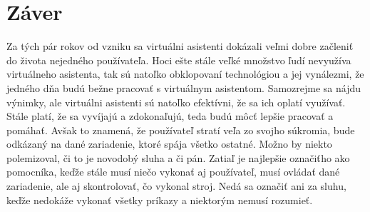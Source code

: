 \documentclass[10pt,twoside,slovak,coursepaper]{article}
\begin{document}
\section{Záver}
Za tých pár rokov od vzniku sa virtuálni asistenti dokázali veľmi dobre začleniť do života nejedného používateľa. Hoci ešte stále veľké množstvo ľudí  nevyužíva virtuálneho asistenta, tak sú natoľko obklopovaní technológiou a jej vynálezmi, že jedného dňa budú bežne pracovať s virtuálnym asistentom. Samozrejme sa nájdu výnimky, ale virtuálni asistenti sú natoľko efektívni, že sa ich oplatí využívať. Stále platí, že sa vyvíjajú a zdokonaľujú, teda budú môcť lepšie pracovať a pomáhať. Avšak to znamená, že používateľ stratí veľa zo svojho súkromia, bude odkázaný na dané zariadenie, ktoré spája všetko ostatné. Možno by niekto polemizoval, či to je novodobý sluha a či pán. Zatiaľ je najlepšie označiťho ako pomocníka, keďže stále musí niečo vykonať aj používateľ, musí ovládať dané zariadenie, ale aj skontrolovať, čo vykonal stroj. Nedá sa označiť ani za sluhu, keďže nedokáže vykonať všetky príkazy a niektorým nemusí rozumieť.



\end{document}
